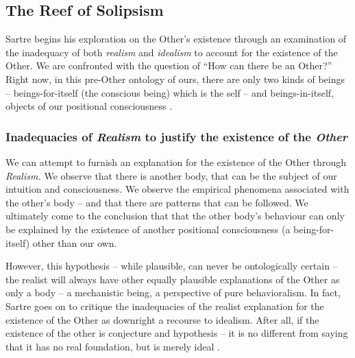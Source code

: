 \subsection{The Reef of Solipsism}

Sartre begins his exploration on the Other's existence \autocite[309 -- 322]{sartre} through an examination of the inadequacy of both \emph{realism} and \emph{idealism} to account for the existence of the Other. We are confronted with the question of \enquote{How can there be an Other?} Right now, in this pre-Other ontology of ours, there are only two kinds of beings -- beings-for-itself (the conscious being) which is the self -- and beings-in-itself, objects of our positional consciousness \autocite[309]{sartre}.

\subsubsection{Inadequacies of \emph{Realism} to justify the existence of the \emph{Other}}

We can attempt to furnish an explanation for the existence of the Other through \emph{Realism.} We observe that there is another body, that can be the subject of our intuition and consciousness. We observe the empirical phenomena associated with the other's body -- and that there are patterns that can be followed. We ultimately come to the conclusion that that the other body's behaviour can only be explained by the existence of another positional consciousness (a being-for-itself) other than our own. 

However, this hypothesis -- while plausible, can never be ontologically certain -- the realist will always have other equally plausible explanations of the Other as only a body -- a mechanistic being, a perspective of pure behavioralism.   In fact, Sartre goes on to critique the inadequacies of the realist explanation for the existence of the Other as downright a recourse to idealism. After all, if the existence of the other is conjecture and hypothesis -- it is no different from saying that it has no real foundation, but is merely ideal \autocite[312]{sartre}.

